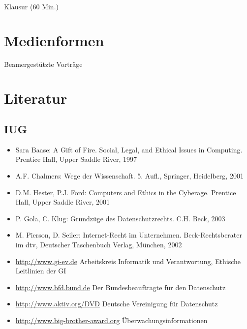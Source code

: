 Klausur (60 Min.)

\hypertarget{medienformenpathlabelmi-2017modulbeschreibungen-bachelorba_mug}{%
\section*{Medienformen\label{/mi-2017/modulbeschreibungen-bachelor/BA_MUG}}\label{medienformenpathlabelmi-2017modulbeschreibungen-bachelorba_mug}}

Beamergestützte Vorträge

\hypertarget{literaturpathlabelmi-2017modulbeschreibungen-bachelorba_mug}{%
\section*{Literatur\label{/mi-2017/modulbeschreibungen-bachelor/BA_MUG}}\label{literaturpathlabelmi-2017modulbeschreibungen-bachelorba_mug}}

\hypertarget{iugpathlabelmi-2017modulbeschreibungen-bachelorba_mug}{%
\subsection*{IUG\label{/mi-2017/modulbeschreibungen-bachelor/BA_MUG}}\label{iugpathlabelmi-2017modulbeschreibungen-bachelorba_mug}}

\begin{itemize}
\tightlist
\item
  Sara Baase: A Gift of Fire. Social, Legal, and Ethical Issues in
  Computing. Prentice Hall, Upper Saddle River, 1997
\item
  A.F. Chalmers: Wege der Wissenschaft. 5. Aufl., Springer, Heidelberg,
  2001
\item
  D.M. Hester, P.J. Ford: Computers and Ethics in the Cyberage. Prentice
  Hall, Upper Saddle River, 2001
\item
  P. Gola, C. Klug: Grundzüge des Datenschutzrechts. C.H. Beck, 2003
\item
  M. Pierson, D. Seiler: Internet-Recht im Unternehmen.
  Beck-Rechtsberater im dtv, Deutscher Taschenbuch Verlag, München, 2002
\item
  \url{http://www.gi-ev.de} Arbeitskreis Informatik und Verantwortung,
  Ethische Leitlinien der GI
\item
  \url{http://www.bfd.bund.de} Der Bundesbeauftragte für den Datenschutz
\item
  \url{http://www.aktiv.org/DVD} Deutsche Vereinigung für Datenschutz
\item
  \url{http://www.big-brother-award.org} Überwachungsinformationen
\end{itemize}

